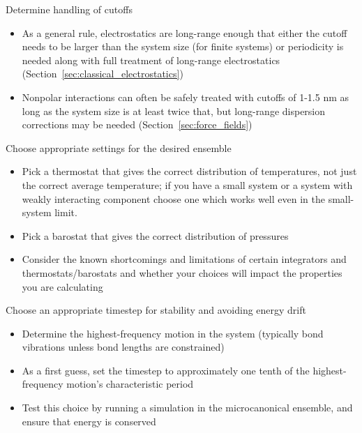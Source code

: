 \documentclass[9pt,bestpractices]{livecoms}
\begin{document}
\begin{Checklists*}[p!]
\begin{checklist}{Determine handling of cutoffs}
\begin{itemize}
\item As a general rule, electrostatics are long-range enough that either the cutoff needs to be larger than the system size (for finite systems) or
periodicity is needed along with full treatment of long-range electrostatics (Section~\ref{sec:classical_electrostatics}) %
\item Nonpolar interactions can often be safely treated with cutoffs of 1-1.5 nm as long as the system size is at least twice that, but long-range dispersion corrections may be needed (Section~\ref{sec:force_fields})
\end{itemize}
\end{checklist}

\begin{checklist}{Choose appropriate settings for the desired ensemble}
\begin{itemize}
\item Pick a thermostat that gives the correct distribution of temperatures, not just the correct average temperature; if you have a small system or a system with weakly interacting component choose one which works well even in the small-system limit.
\item Pick a barostat that gives the correct distribution of pressures
\item Consider the known shortcomings and limitations of certain integrators and thermostats/barostats and whether your choices will impact the properties you are calculating
\end{itemize}
\end{checklist}


\begin{checklist}{Choose an appropriate timestep for stability and avoiding energy drift}
\begin{itemize}
\item Determine the highest-frequency motion in the system (typically bond vibrations unless bond lengths are constrained)
\item As a first guess, set the timestep to approximately one tenth of the highest-frequency motion's characteristic period
\item Test this choice by running a simulation in the microcanonical ensemble, and ensure that energy is conserved
\end{itemize}
\end{checklist}


\end{Checklists*}
\end{document}
